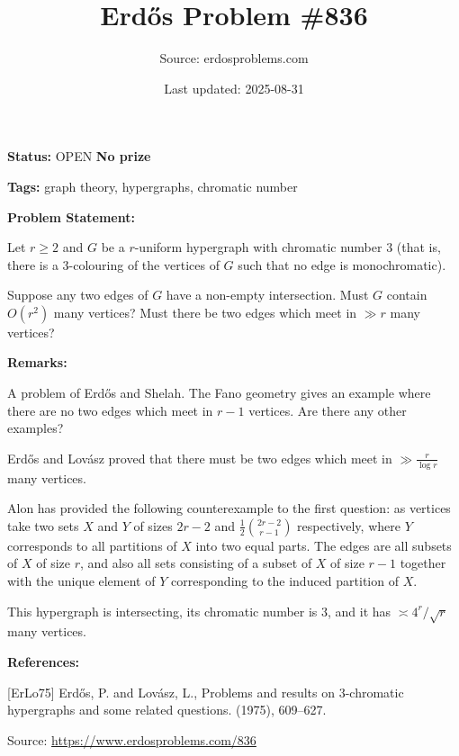 \documentclass{article}
\title{Erd\H{o}s Problem \#836}
\date{Last updated: 2025-08-31}
\author{Source: erdosproblems.com}
\begin{document}
\maketitle

\noindent\textbf{Status:} OPEN \quad \textbf{No prize}

\noindent\textbf{Tags:} graph theory, hypergraphs, chromatic number

\medskip
\noindent\textbf{Problem Statement:}

Let $r\geq 2$ and $G$ be a $r$-uniform hypergraph with chromatic number $3$ (that is, there is a $3$-colouring of the vertices of $G$ such that no edge is monochromatic).

Suppose any two edges of $G$ have a non-empty intersection. Must $G$ contain $O(r^2)$ many vertices? Must there be two edges which meet in $\gg r$ many vertices?

\bigskip
\noindent\textbf{Remarks:}

A problem of Erd\H{o}s and Shelah. The Fano geometry gives an example where there are no two edges which meet in $r-1$ vertices. Are there any other examples?

Erd\H{o}s and Lov\'{a}sz \cite{ErLo75} proved that there must be two edges which meet in $\gg \frac{r}{\log r}$ many vertices.

Alon has provided the following counterexample to the first question: as vertices take two sets $X$ and $Y$ of sizes $2r-2$ and $\frac{1}{2}\binom{2r-2}{r-1}$ respectively, where $Y$ corresponds to all partitions of $X$ into two equal parts. The edges are all subsets of $X$ of size $r$, and also all sets consisting of a subset of $X$ of size $r-1$ together with the unique element of $Y$ corresponding to the induced partition of $X$.

This hypergraph is intersecting, its chromatic number is $3$, and it has $\asymp 4^r/\sqrt{r}$ many vertices.

\bigskip
\noindent\textbf{References:}

[ErLo75] Erd\H{o}s, P. and Lov\'{a}sz, L., Problems and results on {$3$}-chromatic hypergraphs and some
related questions. (1975), 609--627.

\bigskip
\noindent\small{Source: \url{https://www.erdosproblems.com/836}}
\end{document}
